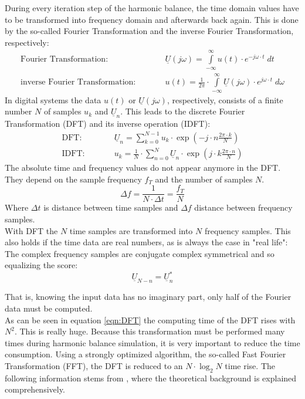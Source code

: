 During every iteration step of the harmonic balance, the time domain
values have to be transformed into frequency domain and afterwards
back again. This is done by the so-called Fourier Transformation and
the inverse Fourier Transformation, respectively:
\begin{eqnarray}
\text{Fourier Transformation:} & \qquad &
     \underline{U}(j\omega) =
     \int\limits_{-\infty}^{\infty} u(t)\cdot e^{-j\omega\cdot t} \; dt \\
\text{inverse Fourier Transformation:} & \qquad &
     u(t) = \frac{1}{2\pi} \cdot \int\limits_{-\infty}^{\infty}
            \underline{U}(j\omega)\cdot e^{j\omega\cdot t} \; d\omega
\end{eqnarray}
In digital systems the data $u(t)$ or $\underline{U}(j\omega)$,
respectively, consists of a finite number $N$ of samples $u_k$ and
$\underline{U}_n$. This leads to the discrete Fourier Transformation
(DFT) and its inverse operation (IDFT):
\begin{eqnarray}
\label{eqn:DFT}
\text{DFT:} & \qquad &
     \underline{U}_n =
     \sum_{k=0}^{N-1} u_k\cdot \exp\left( -j\cdot n\frac{2\pi\cdot k}{N} \right) \\
\text{IDFT:} & \qquad &
     u_k = \frac{1}{N} \cdot \sum_{n=0}^{N}
            \underline{U}_n\cdot \exp\left( j\cdot k\frac{2\pi\cdot n}{N} \right)
\end{eqnarray}
The absolute time and frequency values do not appear anymore in the DFT.
They depend on the sample frequency $f_T$ and the number of samples $N$.
\begin{equation}
\Delta f = \frac{1}{N\cdot\Delta t} = \frac{f_T}{N}
\end{equation}
Where $\Delta t$ is distance between time samples and $\Delta f$
distance between frequency samples.\\
With DFT the $N$ time samples are transformed into $N$ frequency samples.
This also holds if the time data are real numbers, as is always
the case in "real life": The complex frequency samples are conjugate
complex symmetrical and so equalizing the score:
\begin{equation}
\underline{U}_{N-n} = \underline{U}_n^*
\end{equation}

\addvspace{12pt}

That is, knowing the input data has no imaginary part, only half of
the Fourier data must be computed. \\
As can be seen in equation \ref{eqn:DFT} the computing time of the
DFT rises with $N^2$. This is really huge. Because this transformation
must be performed many times during harmonic balance simulation, it is
very important to reduce the time consumption. Using a strongly
optimized algorithm, the so-called Fast Fourier Transformation (FFT),
the DFT is reduced to an $N\cdot\log_2 N$ time rise.
The following information stems from \cite{Press},
where the theoretical background is explained comprehensively.\\

